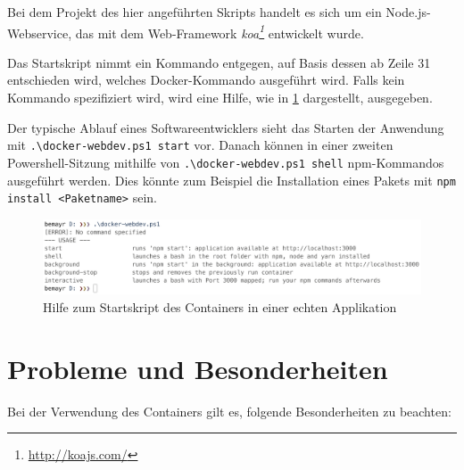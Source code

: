 Bei dem Projekt des hier angeführten Skripts handelt es sich um ein Node.js-Webservice, das mit dem Web-Framework \emph{koa\footnote{\url{http://koajs.com/}}} entwickelt wurde. 


Das Startskript nimmt ein Kommando entgegen, auf Basis dessen ab Zeile 31 entschieden wird, welches Docker-Kommando ausgeführt wird.
Falls kein Kommando spezifiziert wird, wird eine Hilfe, wie in \cref{fig:docker-webdev} dargestellt, ausgegeben.

Der typische Ablauf eines Softwareentwicklers sieht das Starten der Anwendung mit \verb|.\docker-webdev.ps1 start| vor.
Danach können in einer zweiten Powershell-Sitzung mithilfe von \verb|.\docker-webdev.ps1 shell| npm-Kommandos ausgeführt werden.
Dies könnte zum Beispiel die Installation eines Pakets mit \verb|npm install <Paketname>| sein. 
\begin{figure}[htbp]
    \centering
    \includegraphics[width=0.95\linewidth,clip]{images/docker-webdev}
    \caption{Hilfe zum Startskript des Containers in einer echten Applikation}
\label{fig:docker-webdev}
\end{figure}


\section{Probleme und Besonderheiten}
\label{sec:container-problems}
Bei der Verwendung des Containers gilt es, folgende Besonderheiten zu beachten:


